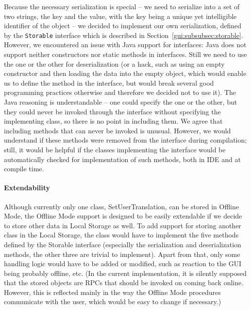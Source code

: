 Because the necessary serialization is special -- we need to serialize into a set of two strings, the key and the value, with the key being a unique yet intelligible identifier of the object -- we decided to implement our own serialization, defined by the {\tt Storable} interface which is described in Section~\ref{gui:subsubsec:storable}.
However, we encountered an issue with Java support for interfaces: Java does not support neither constructors nor static methods in interfaces.
Still we need to use the one or the other for deserialization (or a hack, such as using an empty constructor and then loading the data into the empty object, which would enable us to define the method in the interface, but would break several good programming practices otherwise and therefore we decided not to use it).
The Java reasoning is understandable -- one could specify the one or the other, but they could never be invoked through the interface without specifying the implementing class, so there is no point in including them.
We agree that including methods that can never be invoked is unusual. However, we would understand if these methods were removed from the interface during compilation; still, it would be helpful if the classes implementing the interface would be automatically checked for implementation of such methods, both in IDE and at compile time.


\paragraph{Extendability}
Although currently only one class, SetUserTranslation, can be stored in Offline Mode, the Offline Mode support is designed to be easily extendable if we decide to store other data in Local Storage as well.
To add support for storing another class in the Local Storage, the class would have to implement the five methods defined by the Storable interface (especially the serialization and deserialization methods, the other three are trivial to implement). Apart from that, only some handling logic would have to be added or modified, such as reaction to the GUI being probably offline, etc.
(In the current implementation, it is silently supposed that the stored objects are RPCs that should be invoked on coming back online. However, this is reflected mainly in the way the Offline Mode procedures communicate with the user, which would be easy to change if necessary.)

